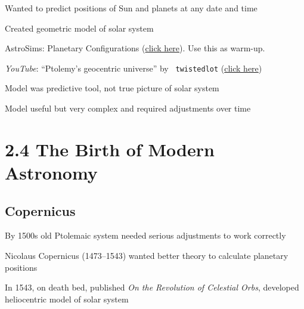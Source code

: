 \documentclass[main.tex]{subfiles}
\begin{document}
Wanted to predict positions of Sun and planets at any date and time

Created geometric model of solar system 

 AstroSims: Planetary Configurations (\href{https://foothillastrosims.github.io/planetary-config-react/}{click here}). Use this as warm-up.

 \textit{YouTube}: ``Ptolemy's geocentric universe'' by \texttt{
twistedlot} (\href{https://youtu.be/utH-GHH1FT8}{click here})

Model was predictive tool, not true picture of solar system

Model useful but very complex and required adjustments over time

\hgraydashline

\clearpage
\section*{2.4 The Birth of Modern Astronomy}





\subsection*{Copernicus} 

By 1500s old Ptolemaic system needed serious adjustments to work correctly

Nicolaus Copernicus (1473--1543) wanted better theory to calculate planetary positions

In 1543, on death bed, published \textit{On the Revolution of Celestial Orbs}, developed heliocentric model of solar system
\end{document}
